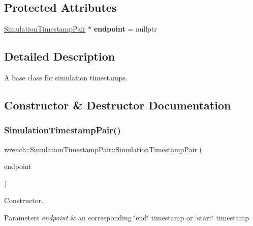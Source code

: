 \subsection*{Protected Attributes}
\begin{DoxyCompactItemize}
\item 
\mbox{\label{classwrench_1_1_simulation_timestamp_pair_ab0bbbd2bd759db2a86a9f7857c4de2f8}} 
\hyperlink{classwrench_1_1_simulation_timestamp_pair}{Simulation\+Timestamp\+Pair} $\ast$ {\bfseries endpoint} = nullptr
\end{DoxyCompactItemize}


\subsection{Detailed Description}
A base class for simulation timestamps. 

\subsection{Constructor \& Destructor Documentation}
\mbox{\label{classwrench_1_1_simulation_timestamp_pair_adff0fb043b6129c02d979de6234c6f60}} 
\subsubsection{\texorpdfstring{Simulation\+Timestamp\+Pair()}{SimulationTimestampPair()}}
{\footnotesize\ttfamily wrench\+::\+Simulation\+Timestamp\+Pair\+::\+Simulation\+Timestamp\+Pair (\begin{DoxyParamCaption}\item[{\hyperlink{classwrench_1_1_simulation_timestamp_pair}{Simulation\+Timestamp\+Pair} $\ast$}]{endpoint }\end{DoxyParamCaption})}



Constructor. 


\begin{DoxyParams}{Parameters}
{\em endpoint} & an corresponding \char`\"{}end\char`\"{} timestamp or \char`\"{}start\char`\"{} timestamp \\
\hline
\end{DoxyParams}


